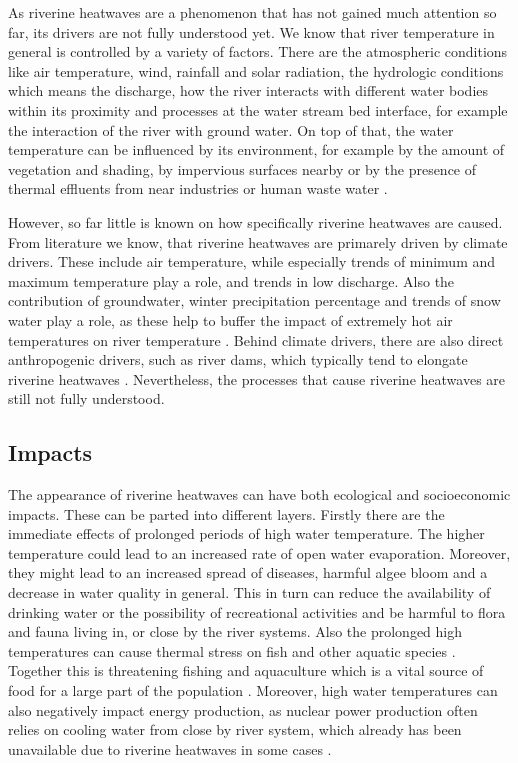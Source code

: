 \documentclass[
]{krantz}
\begin{document}
As riverine heatwaves are a phenomenon that has not gained much attention so far, its drivers are not fully understood
yet. We know that river temperature in general is controlled by a variety of factors. There are the atmospheric
conditions like air temperature, wind, rainfall and solar radiation, the hydrologic conditions which means the
discharge, how the river interacts with different water bodies within its proximity and processes at the water stream
bed interface, for example the interaction of the river with ground water. On top of that, the water temperature can be
influenced by its environment, for example by the amount of vegetation and shading, by impervious surfaces nearby or by
the presence of thermal effluents from near industries or human waste water \citep{vanhamel2025}.

However, so far little is known on how specifically riverine heatwaves are caused. From literature we know, that
riverine heatwaves are primarely driven by climate drivers. These include air temperature, while especially trends of
minimum and maximum temperature play a role, and trends in low discharge. Also the contribution of groundwater, winter
precipitation percentage and trends of snow water play a role, as these help to buffer the impact of extremely hot air
temperatures on river temperature \citep{sadayappan2025}. Behind climate drivers, there are also direct anthropogenic
drivers, such as river dams, which typically tend to elongate riverine heatwaves \citep{sadayappan2025}. Nevertheless, the
processes that cause riverine heatwaves are still not fully understood.

\subsection{Impacts}\label{impacts}

The appearance of riverine heatwaves can have both ecological and socioeconomic impacts. These can be parted into
different layers. Firstly there are the immediate effects of prolonged periods of high water temperature. The higher
temperature could lead to an increased rate of open water evaporation. Moreover, they might lead to an increased spread
of diseases, harmful algee bloom and a decrease in water quality in general. This in turn can reduce the availability
of drinking water or the possibility of recreational activities and be harmful to flora and fauna living in, or close by
the river systems. Also the prolonged high temperatures can cause thermal stress on fish and other aquatic species
\citep{vanhamel2025}. Together this is threatening fishing and aquaculture which is a vital source of food for a large part of
the population \citep{chen2026}. Moreover, high water temperatures can also negatively impact energy production, as nuclear
power production often relies on cooling water from close by river system, which already has been unavailable due to
riverine heatwaves in some cases \citep{vanhamel2025}.
\end{document}
